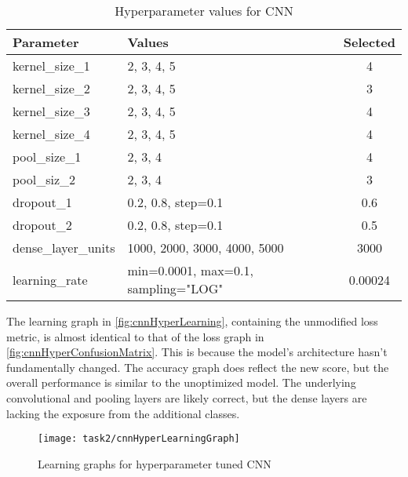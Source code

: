 \bgroup
    \begin{table}[!htbp]
        \centering
        \begin{tabular}{ll|c}
            \hline
            Parameter & Values & Selected \\ \hline
            kernel\_size\_1 & 2, 3, 4, 5 & 4 \\
            kernel\_size\_2 & 2, 3, 4, 5 & 3 \\
            kernel\_size\_3 & 2, 3, 4, 5 & 4 \\
            kernel\_size\_4 & 2, 3, 4, 5 & 4 \\
            pool\_size\_1 & 2, 3, 4 & 4 \\
            pool\_siz\_2 & 2, 3, 4 & 3 \\
            dropout\_1 & 0.2, 0.8, step=0.1 & 0.6 \\
            dropout\_2 & 0.2, 0.8, step=0.1 & 0.5 \\
            dense\_layer\_units & 1000, 2000, 3000, 4000, 5000 & 3000 \\
            learning\_rate & min=0.0001, max=0.1, sampling="LOG" & 0.00024 \\
        \end{tabular}
        \caption{Hyperparameter values for CNN}
        \label{tbl:hyperCNN}
    \end{table}
\egroup

The learning graph in \autoref{fig:cnnHyperLearning}, containing the unmodified loss metric, is almost identical to that of the loss graph in \autoref{fig:cnnHyperConfusionMatrix}. This is because the model's architecture hasn't fundamentally changed. The accuracy graph does reflect the new score, but the overall performance is similar to the unoptimized model. The underlying convolutional and pooling layers are likely correct, but the dense layers are lacking the exposure from the additional classes.

\begin{figure}[!htbp]
    \centering
    \texttt{[image: task2/cnnHyperLearningGraph]}
    \caption[Learning graphs for hyperparameter tuned CNN]
    {Learning graphs for hyperparameter tuned CNN}
    \label{fig:cnnHyperLearning}
\end{figure}



